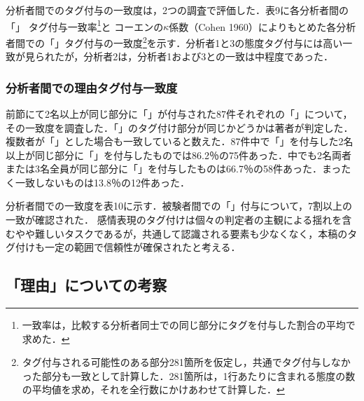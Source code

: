 \documentclass[japanese]{jnlp_1.3a}
\begin{document}
\begin{table}[t]
\begin{center}

    \vspace{\baselineskip}

\end{center}
\end{table}
分析者間でのタグ付与の一致度は，2つの調査で評価した．表9に各分析者間の「」
タグ付与一致率\footnote{
	一致率は，比較する分析者同士での同じ部分にタグを付与した割合の平均で求めた．}と
コーエンの$\kappa$係数（Cohen 1960）によりもとめた各分析者間での「」タグ付与の一致度\footnote{
	タグ付与される可能性のある部分281箇所を仮定し，共通でタグ付与しなかった部分も一致として計算した．281箇所は，1行あたりに含まれる態度の数の平均値を求め，それを全行数にかけあわせて計算した．}を示す．分析者1と3の態度タグ付与には高い一致が見られたが，分析者2は，分析者1および3との一致は中程度であった．

\subsubsection{分析者間での理由タグ付与一致度}

前節にて2名以上が同じ部分に「」が付与された87件それぞれの「」について，その一致度を調査した．「」のタグ付け部分が同じかどうかは著者が判定した．複数者が「」とした場合も一致していると数えた．87件中で「」を付与した2名以上が同じ部分に「」を付与したものでは86.2{\kern0pt}％の75件あった．中でも2名両者または3名全員が同じ部分に「」を付与したものは66.7{\kern0pt}％の58件あった．まったく一致しないものは13.8{\kern0pt}％の12件あった．


\begin{table}[t]
\begin{center}

\end{center}
\end{table}

分析者間での一致度を表10に示す．被験者間での「」付与について，7割以上の一致が確認された．
感情表現のタグ付けは個々の判定者の主観による揺れを含むやや難しいタスクであるが，共通して認識される要素も少なくなく，本稿のタグ付けも一定の範囲で信頼性が確保されたと考える．

\subsection{「理由」についての考察}
\end{document}
